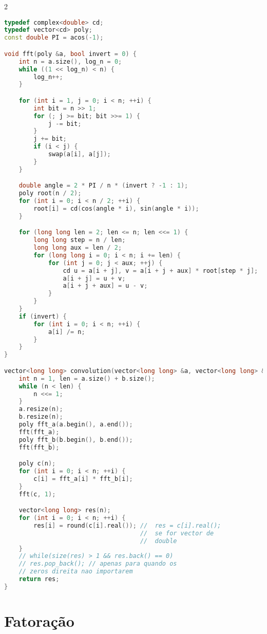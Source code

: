 \documentclass[11pt, a4paper, oneside]{book}
\begin{document}
\begin{multicols}{2}
\begin{lstlisting}[language=C++]
typedef complex<double> cd;
typedef vector<cd> poly;
const double PI = acos(-1);

void fft(poly &a, bool invert = 0) {
    int n = a.size(), log_n = 0;
    while ((1 << log_n) < n) {
        log_n++;
    }

    for (int i = 1, j = 0; i < n; ++i) {
        int bit = n >> 1;
        for (; j >= bit; bit >>= 1) {
            j -= bit;
        }
        j += bit;
        if (i < j) {
            swap(a[i], a[j]);
        }
    }

    double angle = 2 * PI / n * (invert ? -1 : 1);
    poly root(n / 2);
    for (int i = 0; i < n / 2; ++i) {
        root[i] = cd(cos(angle * i), sin(angle * i));
    }

    for (long long len = 2; len <= n; len <<= 1) {
        long long step = n / len;
        long long aux = len / 2;
        for (long long i = 0; i < n; i += len) {
            for (int j = 0; j < aux; ++j) {
                cd u = a[i + j], v = a[i + j + aux] * root[step * j];
                a[i + j] = u + v;
                a[i + j + aux] = u - v;
            }
        }
    }
    if (invert) {
        for (int i = 0; i < n; ++i) {
            a[i] /= n;
        }
    }
}

vector<long long> convolution(vector<long long> &a, vector<long long> &b) {
    int n = 1, len = a.size() + b.size();
    while (n < len) {
        n <<= 1;
    }
    a.resize(n);
    b.resize(n);
    poly fft_a(a.begin(), a.end());
    fft(fft_a);
    poly fft_b(b.begin(), b.end());
    fft(fft_b);

    poly c(n);
    for (int i = 0; i < n; ++i) {
        c[i] = fft_a[i] * fft_b[i];
    }
    fft(c, 1);

    vector<long long> res(n);
    for (int i = 0; i < n; ++i) {
        res[i] = round(c[i].real()); //  res = c[i].real();
                                     //  se for vector de
                                     //  double
    }
    // while(size(res) > 1 && res.back() == 0)
    // res.pop_back(); // apenas para quando os
    // zeros direita nao importarem
    return res;
}
\end{lstlisting}
\end{multicols}

\hfill

\section{Fatoração}
\end{document}
